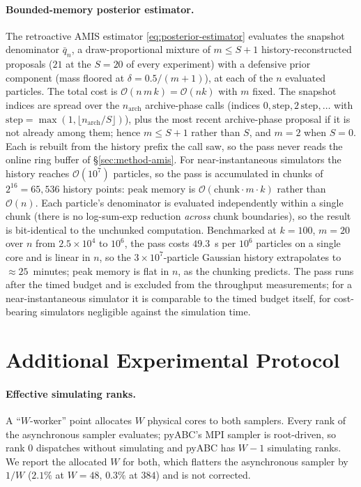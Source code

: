 \documentclass[10pt]{article}
\theoremstyle{plain}
\theoremstyle{definition}
\begin{document}
\paragraph{Bounded-memory posterior estimator.} The retroactive AMIS estimator \eqref{eq:posterior-estimator} evaluates the snapshot denominator $\bar q_n$, a draw-proportional mixture of $m\le S{+}1$ history-reconstructed proposals ($21$ at the $S=20$ of every experiment) with a defensive prior component (mass floored at $\delta=0.5/(m{+}1)$), at each of the $n$ evaluated particles. The total cost is $\mathcal{O}(n\,m\,k)=\mathcal{O}(nk)$ with $m$ fixed. The snapshot indices are spread over the $n_{\text{arch}}$ archive-phase calls (indices $0,\text{step},2\,\text{step},\dots$ with $\text{step}=\max(1,\lfloor n_{\text{arch}}/S\rfloor)$), plus the most recent archive-phase proposal if it is not already among them; hence $m\le S{+}1$ rather than $S$, and $m=2$ when $S=0$. Each is rebuilt from the history prefix the call saw, so the pass never reads the online ring buffer of \S\ref{sec:method-amis}. For near-instantaneous simulators the history reaches $\mathcal{O}(10^7)$ particles, so the pass is accumulated in chunks of $2^{16}=65{,}536$ history points: peak memory is $\mathcal{O}(\text{chunk}\cdot m\cdot k)$ rather than $\mathcal{O}(n)$. Each particle's denominator is evaluated independently within a single chunk (there is no log-sum-exp reduction \emph{across} chunk boundaries), so the result is bit-identical to the unchunked computation. Benchmarked at $k=100$, $m=20$ over $n$ from $2.5\times10^4$ to $10^6$, the pass costs $49.3$~s per $10^6$ particles on a single core and is linear in $n$, so the $3\times10^7$-particle Gaussian history extrapolates to ${\approx}25$~minutes; peak memory is flat in $n$, as the chunking predicts. The pass runs after the timed budget and is excluded from the throughput measurements; for a near-instantaneous simulator it is comparable to the timed budget itself, for cost-bearing simulators negligible against the simulation time.

\section{Additional Experimental Protocol}\label{app:protocol}

\paragraph{Effective simulating ranks.} A ``$W$-worker'' point allocates $W$ physical cores to both samplers. Every rank of the asynchronous sampler evaluates; pyABC's MPI sampler is root-driven, so rank $0$ dispatches without simulating and pyABC has $W{-}1$ simulating ranks. We report the allocated $W$ for both, which flatters the asynchronous sampler by $1/W$ ($2.1\%$ at $W{=}48$, $0.3\%$ at $384$) and is not corrected.
\end{document}
